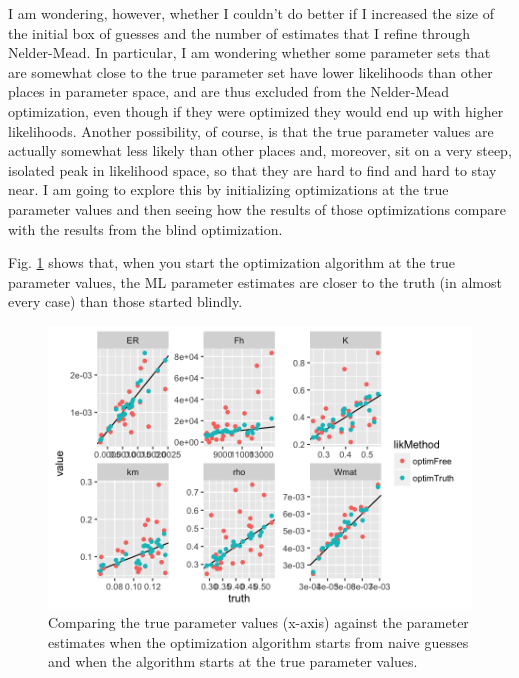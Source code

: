 \documentclass[12pt,reqno,final,pdftex]{amsart}\usepackage[]{graphicx}\usepackage[]{color}
\newenvironment{knitrout}{}{} %
\theoremstyle{plain}
\numberwithin{equation}{part}
\begin{document}
\clearpage

I am wondering, however, whether I couldn't do better if I increased the size of the initial box of guesses and the number of estimates that I refine through Nelder-Mead.
In particular, I am wondering whether some parameter sets that are somewhat close to the true parameter set have lower likelihoods than other places in parameter space, and are thus excluded from the Nelder-Mead optimization, even though if they were optimized they would end up with higher likelihoods.
Another possibility, of course, is that the true parameter values are actually somewhat less likely than other places and, moreover, sit on a very steep, isolated peak in likelihood space, so that they are hard to find and hard to stay near.
I am going to explore this by initializing optimizations at the true parameter values and then seeing how the results of those optimizations compare with the results from the blind optimization.

Fig. \ref{fig:free-vs-truth-start} shows that, when you start the optimization algorithm at the true parameter values, the ML parameter estimates are closer to the truth (in almost every case) than those started blindly.

\begin{knitrout}\scriptsize
{}\color{fgcolor}\begin{figure}

\includegraphics[width=\linewidth]{figure/free-vs-truth-start-1} \hfill{}

\caption[Comparing the true parameter values (x-axis) against the parameter estimates when the optimization algorithm starts from naive guesses and when the algorithm starts at the true parameter values]{Comparing the true parameter values (x-axis) against the parameter estimates when the optimization algorithm starts from naive guesses and when the algorithm starts at the true parameter values.}\label{fig:free-vs-truth-start}
\end{figure}


\end{knitrout}
\end{document}
